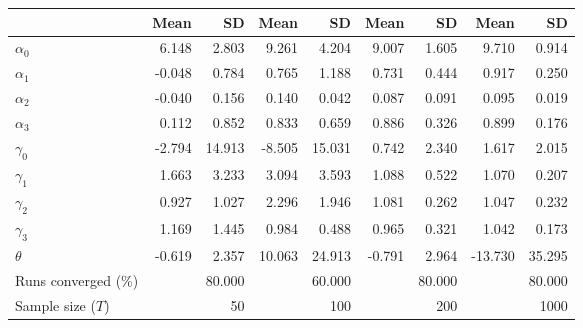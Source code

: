 
\begin{tabular}[t]{lrrrrrrrr}
\toprule
  & Mean & SD & Mean  & SD  & Mean   & SD   & Mean    & SD   \\
\midrule
$\alpha_{0}$ & 6.148 & 2.803 & 9.261 & 4.204 & 9.007 & 1.605 & 9.710 & 0.914\\
$\alpha_{1}$ & -0.048 & 0.784 & 0.765 & 1.188 & 0.731 & 0.444 & 0.917 & 0.250\\
$\alpha_{2}$ & -0.040 & 0.156 & 0.140 & 0.042 & 0.087 & 0.091 & 0.095 & 0.019\\
$\alpha_{3}$ & 0.112 & 0.852 & 0.833 & 0.659 & 0.886 & 0.326 & 0.899 & 0.176\\
$\gamma_{0}$ & -2.794 & 14.913 & -8.505 & 15.031 & 0.742 & 2.340 & 1.617 & 2.015\\
$\gamma_{1}$ & 1.663 & 3.233 & 3.094 & 3.593 & 1.088 & 0.522 & 1.070 & 0.207\\
$\gamma_{2}$ & 0.927 & 1.027 & 2.296 & 1.946 & 1.081 & 0.262 & 1.047 & 0.232\\
$\gamma_{3}$ & 1.169 & 1.445 & 0.984 & 0.488 & 0.965 & 0.321 & 1.042 & 0.173\\
$\theta$ & -0.619 & 2.357 & 10.063 & 24.913 & -0.791 & 2.964 & -13.730 & 35.295\\
Runs converged (\%) &  & 80.000 &  & 60.000 &  & 80.000 &  & 80.000\\
Sample size ($T$) &  & 50 &  & 100 &  & 200 &  & 1000\\
\bottomrule
\end{tabular}
